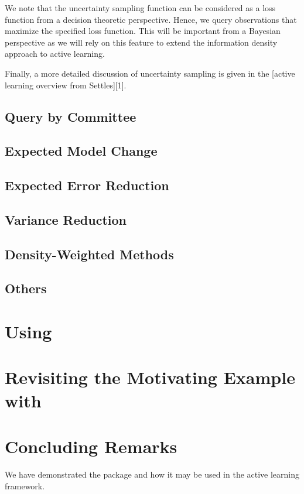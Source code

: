 \documentclass[article]{jss}
\begin{document}
	We note that the uncertainty sampling function can be considered as a loss function from a decision theoretic perspective. Hence, we query observations that maximize the specified loss function. This will be important from a Bayesian perspective as we will rely on this feature to extend the information density approach to active learning.

	Finally, a more detailed discussion of uncertainty sampling is given in the [active learning overview from Settles][1].
	
	\subsection{Query by Committee} 
	\subsection{Expected Model Change} 
	\subsection{Expected Error Reduction} 
	\subsection{Variance Reduction} 
	\subsection{Density-Weighted Methods} 
	\subsection{Others} 

\section{Using }

\section{Revisiting the Motivating Example with }

\section{Concluding Remarks}

We have demonstrated the  package  and how it may be used in the active learning framework.
\end{document}

